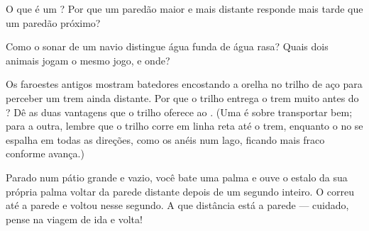 \begin{exercise}[$\star$]\label{exo:g4:how-sound-travels:8}
O que é um ? Por que um paredão maior e mais distante responde
mais tarde que um paredão próximo?
\end{exercise}

\begin{exercise}[$\star$]\label{exo:g4:how-sound-travels:9}
Como o sonar de um navio distingue água funda de água rasa? Quais
dois animais jogam o mesmo jogo, e onde?
\end{exercise}

\begin{exercise}[$\star\star$]\label{exo:g4:how-sound-travels:10}
Os faroestes antigos mostram batedores encostando a orelha no trilho
de aço para perceber um trem ainda distante. Por que o trilho entrega
o trem muito antes do ? Dê as duas vantagens que o trilho oferece
ao . (Uma é sobre transportar bem; para a outra, lembre que o
trilho corre em linha reta até o trem, enquanto o  no  se
espalha em todas as direções, como os anéis num lago, ficando mais
fraco conforme avança.)
\end{exercise}

\begin{exercise}[$\star\star$]\label{exo:g4:how-sound-travels:11}
Parado num pátio grande e vazio, você bate uma palma e ouve o estalo
da sua própria palma voltar da parede distante depois de um segundo
inteiro. O  correu até a parede e voltou nesse segundo. A que
distância está a parede --- cuidado, pense na viagem de ida e volta!
\end{exercise}
